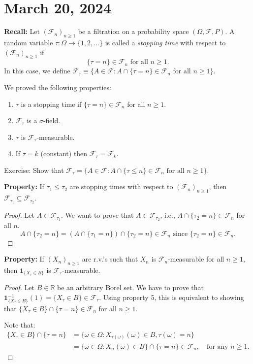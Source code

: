 \newpage
\section{March 20, 2024}

\textbf{Recall:}
Let $(\mathcal{F}_n)_{n\geq 1}$ be a filtration on a probability space $(\Omega, \mathcal{F}, P)$. A random variable $\tau: \Omega \to \{1, 2, \ldots \}$ is called a \textit{stopping time} with respect to $(\mathcal{F}_n)_{n\geq 1}$ if
\[
\{\tau = n\} \in \mathcal{F}_n \text{ for all } n \geq 1.
\]
In this case, we define $\mathcal{F}_\tau \equiv \{A \in \mathcal{F}: A \cap \{\tau = n\} \in \mathcal{F}_n \text{ for all } n \geq 1\}$.


We proved the following properties:
\begin{enumerate}
    \item $\tau$ is a stopping time if $\{\tau = n\} \in \mathcal{F}_n$ for all $n \geq 1$.
    \item $\mathcal{F}_\tau$ is a $\sigma$-field.
    \item $\tau$ is $\mathcal{F}_\tau$-measurable.
    \item If $\tau = k$ (constant) then $\mathcal{F}_\tau = \mathcal{F}_k$.
\end{enumerate}
Exercise: Show that $\mathcal{F}_\tau = \{A \in \mathcal{F}: A \cap \{\tau \leq n\} \in \mathcal{F}_n \text{ for all } n \geq 1\}$.


\textbf{Property:}
If $\tau_1 \leq \tau_2$ are stopping times with respect to $(\mathcal{F}_n)_{n\geq 1}$, then $\mathcal{F}_{\tau_1} \subseteq \mathcal{F}_{\tau_2}$.

\begin{proof}
Let $A \in \mathcal{F}_{\tau_1}$. We want to prove that $A \in \mathcal{F}_{\tau_2}$, i.e., $A \cap \{\tau_2 = n\} \in \mathcal{F}_n$ for all $n$.
\[
A \cap \{\tau_2 = n\} = (A \cap \{\tau_1 = n\}) \cap \{\tau_2 = n\} \in \mathcal{F}_n \text{ since } \{\tau_2 = n\} \in \mathcal{F}_n.
\]
\end{proof}

\textbf{Property:}
If $(X_n)_{n\geq 1}$ are r.v.'s such that $X_n$ is $\mathcal{F}_n$-measurable for all $n \geq 1$, then $\mathbf{1}_{\{X_{\tau} \in B\}}$ is $\mathcal{F}_{\tau}$-measurable.

\begin{proof}
Let $B \in \mathbb{R}$ be an arbitrary Borel set. We have to prove that $\mathbf{1}_{\{X_{\tau} \in B\}}^{-1}(1) = \{X_{\tau} \in B\} \in \mathcal{F}_{\tau}$. Using property 5, this is equivalent to showing that $\{X_{\tau} \in B\} \cap \{\tau = n\} \in \mathcal{F}_n$ for all $n \geq 1$.

Note that:
\begin{align*}
\{X_{\tau} \in B\} \cap \{\tau = n\} &= \{\omega \in \Omega : X_{\tau(\omega)}(\omega) \in B, \tau(\omega) = n\} \\
&= \{\omega \in \Omega : X_n(\omega) \in B\} \cap \{\tau = n\} \in \mathcal{F}_n, \quad \text{for any } n \geq 1.
\end{align*}
\end{proof}

